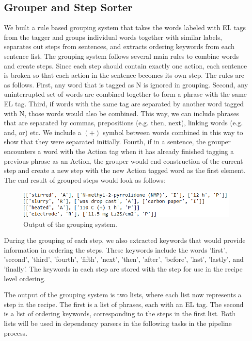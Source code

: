\subsection{Grouper and Step Sorter}

We built a rule based grouping system that takes the words labeled with EL tags from the tagger and groups individual words together with similar labels, separates out steps from sentences, and extracts ordering keywords from each sentence list. The grouping system follows several main rules to combine words and create steps. Since each step should contain exactly one action, each sentence is broken so that each action in the sentence becomes its own step. The rules are as follows. First, any word that is tagged as N is ignored in grouping. Second, any uninterrupted set of words are combined together to form a phrase with the same EL tag. Third, if words with the same tag are separated by another word tagged with N, those words would also be combined. This way, we can include phrases that are separated by commas, prepositions (e.g. then, next), linking words (e.g. and, or) etc. We include a $(+)$ symbol between words combined in this way to show that they were separated initially. Fourth, if in a sentence, the grouper encounters a word with the Action tag when it has already finished tagging a previous phrase as an Action, the grouper would end construction of the current step and create a new step with the new Action tagged word as the first element. The end result of grouped steps would look as follows:

\begin{figure}
  \centering
    \includegraphics[width=.5\textwidth]{grouperout.png}
  \caption{Output of the grouping system.}
\end{figure}

During the grouping of each step, we also extracted keywords that would provide information in ordering the steps. These keywords include the words 'first', 'second', 'third', 'fourth', 'fifth', 'next', 'then', 'after', 'before', 'last', 'lastly', and 'finally'. The keywords in each step are stored with the step for use in the recipe level ordering. 

The output of the grouping system is two lists, where each list now represents a step in the recipe. The first is a list of phrases, each with an EL tag. The second is a list of ordering keywords, corresponding to the steps in the first list. Both lists will be used in dependency parsers in the following tasks in the pipeline process.

